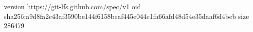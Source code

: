version https://git-lfs.github.com/spec/v1
oid sha256:a9d8fa2c43af3590be144f6158beaf445e044e1fa66afd48d54e35daaf6d4beb
size 286479
